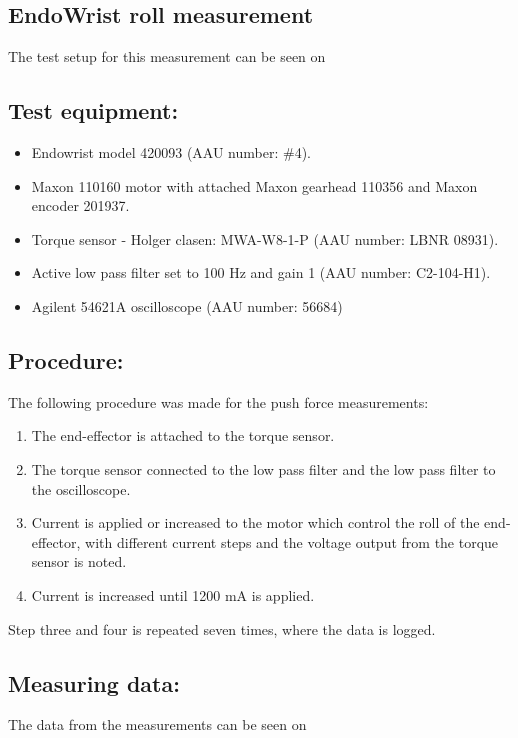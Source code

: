 \subsection{EndoWrist roll measurement}%
The test setup for this measurement can be seen on 

\subsection*{Test equipment:}
\begin{itemize}
\item Endowrist model 420093 (AAU number: \#4).
\item Maxon 110160 motor with attached Maxon gearhead 110356 and Maxon encoder 201937.
\item Torque sensor - Holger clasen: MWA-W8-1-P (AAU number: LBNR 08931).
\item Active low pass filter set to 100 Hz and gain 1 (AAU number: C2-104-H1).
\item Agilent 54621A oscilloscope (AAU number: 56684)
\end{itemize}

\subsection*{Procedure:}
The following procedure was made for the push force measurements:
\begin{enumerate}
\item The end-effector is attached to the torque sensor. 
\item The torque sensor connected to the low pass filter and the low pass filter to the oscilloscope.
\item Current is applied or increased to the motor which control the roll of the end-effector, with different current steps and the voltage output from the torque sensor is noted.
\item Current is increased until 1200 mA is applied.
\end{enumerate}
Step three and four is repeated seven times, where the data is logged. 

\subsection*{Measuring data:}
The data from the measurements can be seen on %


